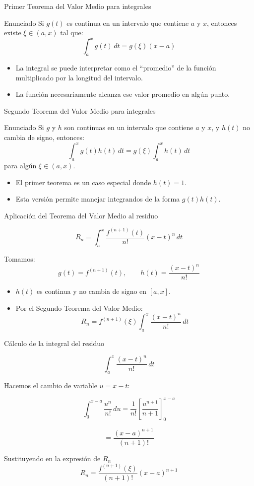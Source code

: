 \documentclass[main.tex]{subfiles}
\begin{document}
\begin{frame}{Primer Teorema del Valor Medio para integrales}
\small
\begin{block}{Enunciado}
Si \(g(t)\) es continua en un intervalo que contiene \(a\) y \(x\), entonces existe
\(\xi \in (a,x)\) tal que:
\[
\int_a^x g(t)\, dt = g(\xi)(x-a)
\]
\end{block}

\begin{itemize}
  \item La integral se puede interpretar como el “promedio” de la función
    multiplicado por la longitud del intervalo.
  \item La función necesariamente alcanza ese valor promedio en algún punto.
\end{itemize}
\end{frame}
\begin{frame}{Segundo Teorema del Valor Medio para integrales}
\small
\begin{block}{Enunciado}
Si \(g\) y \(h\) son continuas en un intervalo que contiene \(a\) y \(x\), 
y \(h(t)\) no cambia de signo, entonces:
\[
\int_a^x g(t)h(t)\,dt = g(\xi)\int_a^x h(t)\, dt
\]
para algún \(\xi \in (a,x)\).
\end{block}

\begin{itemize}
  \item El primer teorema es un caso especial donde \(h(t)=1\).
  \item Esta versión permite manejar integrandos de la forma \(g(t)h(t)\).
\end{itemize}
\end{frame}
\begin{frame}{Aplicación del Teorema del Valor Medio al residuo}
\small

\[
R_n = \int_{a}^{x} 
\frac{f^{(n+1)}(t)}{n!} (x-t)^n\, dt
\]

Tomamos:
\[
g(t) = f^{(n+1)}(t), \qquad
h(t) = \frac{(x-t)^n}{n!}
\]

\begin{itemize}
  \item \(h(t)\) es continua y no cambia de signo en \([a,x]\).
  \item Por el Segundo Teorema del Valor Medio:
\[
R_n = f^{(n+1)}(\xi)
\int_{a}^{x} \frac{(x-t)^n}{n!}\, dt
\]
\end{itemize}
\end{frame}
\begin{frame}{Cálculo de la integral del residuo}
\small

\[
\int_{a}^{x} \frac{(x-t)^n}{n!}\, dt
\]

Hacemos el cambio de variable \(u = x-t\):

\[
\int_{0}^{x-a} \frac{u^n}{n!}\, du
= \frac{1}{n!}\left[\frac{u^{n+1}}{n+1}\right]_{0}^{x-a}
\]

\[
= \frac{(x-a)^{n+1}}{(n+1)!}
\]

\begin{block}{Sustituyendo en la expresión de \(R_n\)}
\[
R_n = \frac{f^{(n+1)}(\xi)}{(n+1)!}(x-a)^{n+1}
\]
\end{block}
\end{frame}
\end{document}
